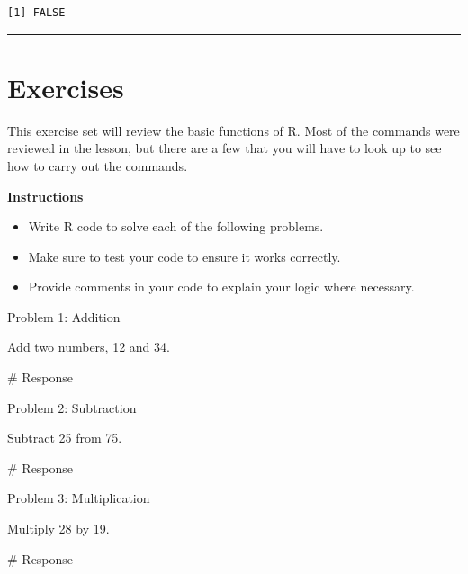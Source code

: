\documentclass[
  letterpaper,
  DIV=11,
  numbers=noendperiod]{scrreprt}
\newenvironment{Shaded}{\begin{snugshade}}{\end{snugshade}}
\newcommand{\CommentTok}[1]{\textcolor[rgb]{0.37,0.37,0.37}{#1}}
\providecommand{\tightlist}{%
  \setlength{\itemsep}{0pt}\setlength{\parskip}{0pt}}\usepackage{longtable,booktabs,array}
\begin{document}
\begin{verbatim}
[1] FALSE
\end{verbatim}

\begin{center}\rule{0.5\linewidth}{0.5pt}\end{center}

\section*{Exercises}\label{exercises-1}


This exercise set will review the basic functions of R. Most of the
commands were reviewed in the lesson, but there are a few that you will
have to look up to see how to carry out the commands.

\textbf{Instructions}

\begin{itemize}
\tightlist
\item
  Write R code to solve each of the following problems.
\item
  Make sure to test your code to ensure it works correctly.
\item
  Provide comments in your code to explain your logic where necessary.
\end{itemize}

Problem 1: Addition

Add two numbers, 12 and 34.

\begin{Shaded}
\begin{Highlighting}[]
\CommentTok{\# Response}
\end{Highlighting}
\end{Shaded}

Problem 2: Subtraction

Subtract 25 from 75.

\begin{Shaded}
\begin{Highlighting}[]
\CommentTok{\# Response}
\end{Highlighting}
\end{Shaded}

Problem 3: Multiplication

Multiply 28 by 19.

\begin{Shaded}
\begin{Highlighting}[]
\CommentTok{\# Response}
\end{Highlighting}
\end{Shaded}
\end{document}
